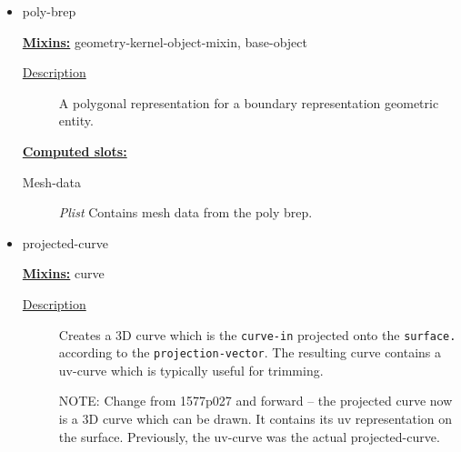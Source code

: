 \documentclass [11pt]{book}
\begin{document}
\begin{itemize}
\begin{description}
\end{description}







\item {}poly-brep


\textbf{
\underline{Mixins:}} geometry-kernel-object-mixin, base-object





\begin{description}

\item [
\underline{Description}]


A polygonal representation for a boundary representation geometric entity.



\end{description}








\textbf{
\underline{Computed slots:}}

\begin{description}

\item [Mesh-data]
\emph{Plist} Contains mesh data from the poly brep.


\end{description}







\item {}projected-curve


\textbf{
\underline{Mixins:}} curve





\begin{description}

\item [
\underline{Description}]


Creates a 3D curve which is the \texttt{curve-in} 
projected onto the \texttt{surface.} according to the \texttt{projection-vector}. 
The resulting curve contains a uv-curve which is typically useful for trimming.

NOTE: Change from 1577p027 and forward -- the projected curve now is a 3D curve which 
can be drawn. It contains its uv representation on the surface. Previously, the uv-curve
was the actual projected-curve.






\end{description}
\end{itemize}
\end{document}
